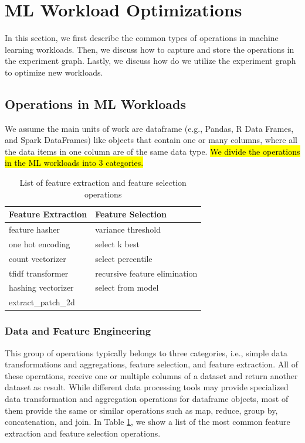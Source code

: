 \section{ML Workload Optimizations} \label{sec-ml-workloads}
In this section, we first describe the common types of operations in machine learning workloads.
Then, we discuss how to capture and store the operations in the experiment graph.
Lastly, we discuss how do we utilize the experiment graph to optimize new workloads.

\subsection{Operations in ML Workloads}
We assume the main units of work are dataframe (e.g., Pandas, R Data Frames, and Spark DataFrames) like objects that contain one or many columns, where all the data items in one column are of the same data type.
\hl{We divide the operations in the ML workloads into 3 categories.}
\begin{table}
\centering
\begin{tabular}{ll}
\hline
	   Feature Extraction & Feature Selection\\ \hline
        feature hasher & variance threshold  \\
        one hot encoding & select k best \\
        count vectorizer& select percentile \\ 
        tfidf transformer & recursive feature elimination \\
        hashing vectorizer & select from model \\
        extract\_patch\_2d &  \\
        \hline
\end{tabular}
\caption{List of feature extraction and feature selection operations}\label{feature-engineering-operations}
\end{table}

\subsubsection{Data and Feature Engineering}
This group of operations typically belongs to three categories, i.e., simple data transformations and aggregations, feature selection, and feature extraction.
All of these operations, receive one or multiple columns of a dataset and return another dataset as result. 
While different data processing tools may provide specialized data transformation and aggregation operations for dataframe objects, most of them provide the same or similar operations such as map, reduce, group by, concatenation, and join. 
In Table \ref{feature-engineering-operations}, we show a list of the most common feature extraction and feature selection operations.


